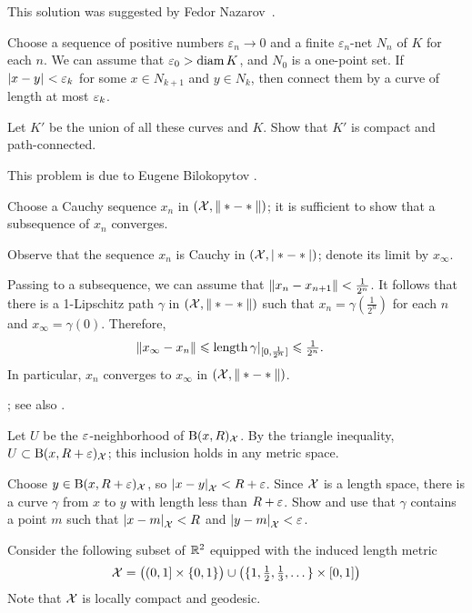 This solution was suggested by Fedor Nazarov~\cite{nazarov}.

Choose a sequence of positive numbers $\varepsilon_n\to 0$ and a finite $\varepsilon_n$-net $N_n$ of $K$ for each $n$.
We can assume that $\varepsilon_0>\operatorname{\rm diam}\nolimits K$, and $N_0$ is a one-point set.
If $\dist{x}{y}{}<\eps_k$ for some $x\in N_{k+1}$ and $y\in N_{k}$, then connect them by a curve of length at most $\varepsilon_k$.

Let $K'$ be the union of all these curves and $K$.
Show that $K'$ is compact and path-connected.

 This problem is due to Eugene Bilokopytov \cite{bilokopytov}.

Choose a Cauchy sequence $x_n$ in $(\spc{X},\|*\z-*\|)$; it is sufficient to show that a subsequence of $x_n$ converges.

Observe that the sequence $x_n$ is Cauchy in $(\mathcal{X},|*-*|)$;
denote its limit by $x_\infty$.

Passing to a subsequence, we can assume that $\|x_n-x_{n+1}\|\z<\tfrac1{2^n}$.
It follows that there is a 1-Lipschitz path $\gamma$ in $(\mathcal{X},\|*-*\|)$ such that $x_n=\gamma(\tfrac1{2^n})$ for each $n$ and $x_\infty=\gamma(0)$.
Therefore,
\begin{align*}
\|x_\infty-x_n\|&\leqslant \mathop{\rm length}\nolimits\gamma|_{[0,\frac1{2^n}]}\leqslant \tfrac1{2^n}.
\end{align*}
In particular, $x_n$ converges to $x_\infty$ in $(\spc{X},\|*\z-*\|)$.

 \cite[Corollary]{hu-kirk}; see also \cite[Lemma 2.3]{petrunin-stadler}.

Let $U$ be the $\varepsilon$-neighborhood of $\mathrm{B}{}(x,R)_{\mathcal{X}}$.
By the triangle inequality, $U\z\subset \oBall(x,R+\eps)_{\spc{X}}$;
this inclusion holds in any metric space.

Choose $y\in \mathrm{B}{}(x,R+\varepsilon)_{\mathcal{X}}$, so $\dist{x}{y}{{\spc{X}}}\z<R+\eps$.
Since ${\mathcal{X}}$ is a length space, there is a curve $\gamma$ from $x$ to $y$ with length less than $R+\varepsilon$.
Show and use that $\gamma$ contains a point $m$ such that $\dist{x}{m}{{\spc{X}}}<R$ and $\dist{y}{m}{{\spc{X}}}<\eps$.

Consider the following subset of $\mathbb{R}^2$ equipped with the induced length metric
\[
\mathcal{X}
=
\bigl((0,1]\times\{0,1\}\bigr)
\cup
\bigl(\{1,\tfrac12,\tfrac13,\dots\}\times[0,1]\bigr)
\]
Note that $\mathcal{X}$ is locally compact and geodesic.

